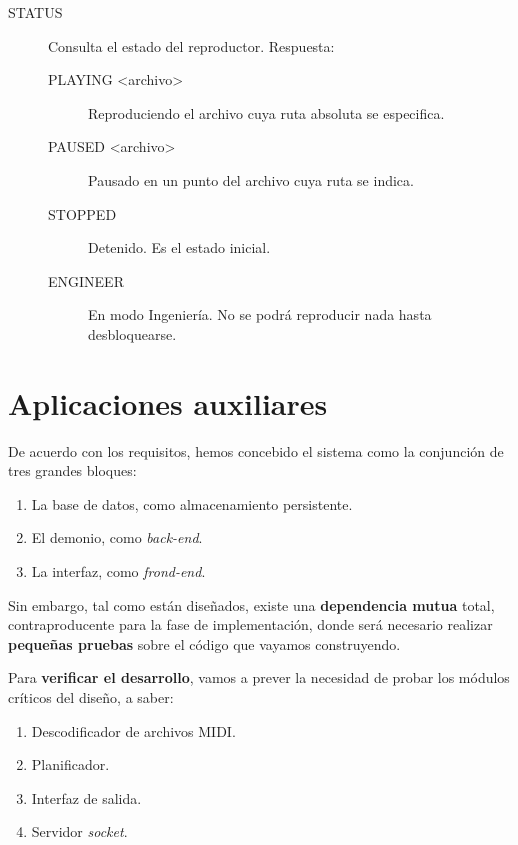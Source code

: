 \begin{description}
	\item[STATUS] Consulta el estado del reproductor. Respuesta:
	
	\begin{description}
		\item[PLAYING <archivo>] Reproduciendo el archivo cuya ruta absoluta se especifica.
		\item[PAUSED <archivo>] Pausado en un punto del archivo cuya ruta se indica.
		\item[STOPPED] Detenido. Es el estado inicial.
		\item[ENGINEER] En modo Ingeniería. No se podrá reproducir nada hasta desbloquearse.
	\end{description}
	
\end{description}

\newpage

\section{Aplicaciones auxiliares}

De acuerdo con los requisitos, hemos concebido el sistema como la conjunción de tres grandes bloques:

\begin{enumerate}
	\item La base de datos, como almacenamiento persistente.
	\item El demonio, como \textit{back-end}.
	\item La interfaz, como \textit{frond-end}.
\end{enumerate}

Sin embargo, tal como están diseñados, existe una \textbf{dependencia mutua} total, contraproducente para la fase de implementación, donde será necesario realizar \textbf{pequeñas pruebas} sobre el código que vayamos construyendo.

Para \textbf{verificar el desarrollo}, vamos a prever la necesidad de probar los módulos críticos del diseño, a saber:

\begin{enumerate}
	\item Descodificador de archivos \acrshort{MIDI}.
	\item Planificador.
	\item Interfaz de salida.
	\item Servidor \textit{socket}.
\end{enumerate}

\smallskip

